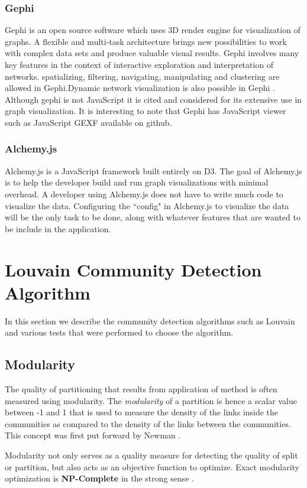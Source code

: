 \subsection{Gephi}

Gephi is an open source software which uses 3D render engine for visualization of graphs. 
A flexible and multi-task architecture brings new possibilities
to work with complex data sets and produce
valuable visual results. 
Gephi involves many key features in the context of interactive exploration and
interpretation of networks.  spatializing, filtering,
navigating, manipulating and clustering are allowed in Gephi.Dynamic network visualization is also possible in Gephi \cite{gephi}.
Although gephi is not JavaScript it is cited and considered for its extensive use in graph visualization. It is interesting to note that Gephi has JavaScript viewer such as JavaScript GEXF available on github. 

\subsection{Alchemy.js}
Alchemy.js is a JavaScript framework built entirely on D3. The goal of Alchemy.js is to help the developer build and run graph visualizations with minimal overhead. A developer using  Alchemy.js does not have to write much code to visualize the data. Configuring the ``config" in Alchemy.js to visualize the data will be the only task to be done, along with whatever features that are wanted to be include in the application.

\chapter{Louvain Community Detection Algorithm}
In this section we describe the community detection algorithms such as Louvain and various tests that were performed to choose the algorithm. 
 
\section{Modularity}
The quality of partitioning that results from application of method is often measured using modularity. The \textit{modularity} of a partition is hence a scalar value between -1 and 1 that is used to measure the density of the links inside the communities as compared to the density of the links between the communities. This concept was first put forward by Newman \cite{newman2006modularity}.
\par
Modularity not only serves as a quality measure for detecting the quality of split or partition, but also acts as an objective function to optimize.  Exact modularity optimization is \textbf{NP-Complete} in the strong sense \cite{modularityNP}.
